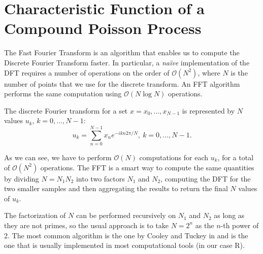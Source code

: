 \chapter{Characteristic Function of a Compound Poisson Process }
\label{app:FFT}

The Fast Fourier Transform is an algorithm that enables us to compute the Discrete Fourier Transform faster. In particular, a \textit{na\"ive} implementation of the DFT requires a number of operations on the order of $\mathcal{O}(N^2)$, where $N$ is the number of points that we use for the discrete transform. An FFT algorithm performs the same computation using $\mathcal{O}(N \log N)$ operations.


 The discrete Fourier transform for a set $x = x_0 , ..., x_{N-1}$ is  represented by $N$ values $u_k$, $k=0, ..., N-1$:
\begin{equation}
\label{eq:dft_single}
	u_k = \sum_{n=0}^{N-1} x_n e^{-i  k n 2\pi / N}, \: k= 0, \dots, N-1.
\end{equation}


As we can see, we have to perform $\mathcal{O}(N)$ computations for each $u_k$, for a total of $\mathcal{O}(N^2)$ operations.
The FFT is a smart way to compute the same quantities by dividing $ N = N_1N_2$ into two factors $ N_1$ and $N_2$, computing the DFT for the two smaller samples and then aggregating the results to return the final $N$ values of $u_k$.

The factorization of $N$ can be performed recursively on $N_1$ and $N_2$ as long as they are not primes, so the usual approach is to take $N=2^n$ as the $n$-th power of 2. 
The most common algorithm is the one by Cooley and Tuckey in \cite{COOLEY_FFT} and is the one that is usually implemented in most computational tools (in our case R).




